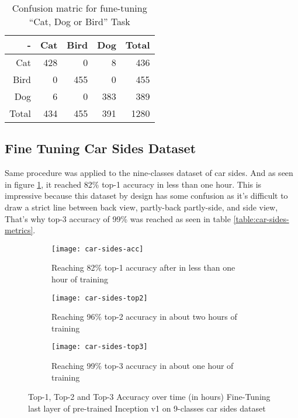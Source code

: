 \begin{table*}\caption{Confusion matric for fune-tuning ``Cat, Dog or Bird'' Task}\label{table:confusion-cat-dog-bird}
\centering
\begin{tabular}{rrrrr}
\toprule
-     &   Cat & Bird & Dog & Total \\
\midrule
Cat   &   428 &    0 &   8 &  436 \\
Bird  &     0 &  455 &   0 &  455 \\
Dog   &     6 &    0 & 383 &  389 \\
\midrule
Total &   434 &  455 & 391 & 1280 \\
\bottomrule
\end{tabular}
\end{table*}


\subsection{Fine Tuning Car Sides Dataset} \label{fine-car-sides}

Same procedure was applied to the nine-classes dataset of car sides. 
And as seen in figure \ref{fig:fine-car-sides-acc},
it reached 82\% top-1 accuracy in less than one hour.
This is impressive because this dataset by design has some confusion
as it's difficult to draw a strict line between back view, partly-back partly-side, and side view,
That's why top-3 accuracy of 99\% was reached as seen in table \ref{table:car-sides-metrics}.

\begin{figure}[!htbp]
\centering
    \begin{subfigure}[b]{\textwidth}
        \centering
        \texttt{[image: car-sides-acc]}
        \caption{Reaching 82\% top-1 accuracy after in less than one hour of training}
    \end{subfigure}
    \begin{subfigure}[t]{0.48\textwidth}
        \centering
        \texttt{[image: car-sides-top2]}
        \caption{Reaching 96\% top-2 accuracy in about two hours of training}
    \end{subfigure}
    \begin{subfigure}[t]{0.48\textwidth}
        \centering
        \texttt{[image: car-sides-top3]}
        \caption{Reaching 99\% top-3 accuracy in about one hour of training}
    \end{subfigure}
\caption{Top-1, Top-2 and Top-3 Accuracy over time (in hours) Fine-Tuning last layer of pre-trained Inception v1 on 9-classes car sides dataset}\label{fig:fine-car-sides-acc}
\end{figure}

